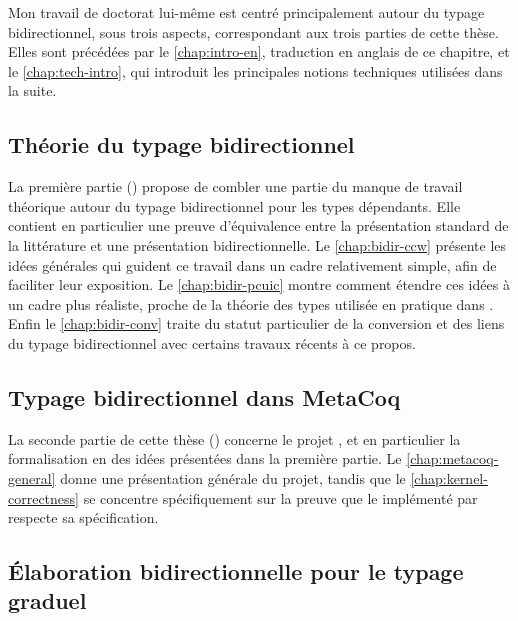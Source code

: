 Mon travail de doctorat lui-même
est centré principalement autour du typage bidirectionnel, sous
trois aspects, correspondant aux trois parties de cette thèse.
Elles sont précédées par le \cref{chap:intro-en}, traduction en anglais
de ce chapitre, et le \cref{chap:tech-intro}, qui introduit les principales
notions techniques utilisées dans la suite.

\subsection{Théorie du typage bidirectionnel}

La première partie () propose de combler une partie du
manque de travail théorique autour du typage bidirectionnel pour les types dépendants.
Elle contient en particulier une
preuve d’équivalence entre la présentation standard de la littérature
et une présentation bidirectionnelle.
Le \cref{chap:bidir-ccw} présente les idées générales qui guident ce travail
dans un cadre relativement simple, afin de faciliter leur exposition. 
Le \cref{chap:bidir-pcuic} montre comment étendre ces idées à un
cadre plus réaliste, proche de la théorie des types utilisée en pratique dans .
Enfin le \cref{chap:bidir-conv} traite du statut particulier de la
conversion
et des liens du typage bidirectionnel avec certains travaux récents
à ce propos.

\subsection{Typage bidirectionnel dans MetaCoq}

La seconde partie de cette thèse ()
concerne le projet ,
et en particulier la formalisation en  des idées présentées dans la
première partie. Le \cref{chap:metacoq-general} donne une présentation générale du
projet, tandis que le \cref{chap:kernel-correctness} se concentre spécifiquement
sur la preuve que le  implémenté par  respecte sa spécification.

\subsection{Élaboration bidirectionnelle pour le typage graduel}

